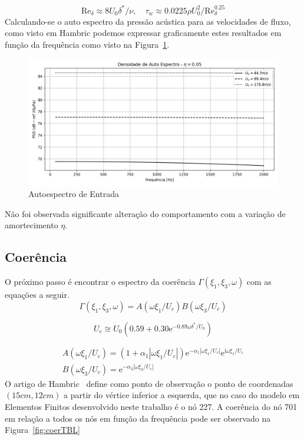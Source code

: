 \documentclass[9pt,a4paper,twoside]{rho-class/rho}
\begin{document}
\begin{equation}
	\mathrm{Re}_\delta\approx8U_0\delta^*/\nu, \quad \tau_w\approx0.0225\rho U_0^2/\mathrm{Re}_\delta^{0.25}
\end{equation}
Calculando-se o auto espectro da pressão acústica para as velocidades de fluxo, como visto em Hambric \cite{hambricVibrationsPlatesClamped2004} podemos expressar graficamente estes resultados em função da frequência como visto na Figura~\ref{fig:psd}.
\begin{figure}[H]
	\centering
	\includegraphics[width=0.9\columnwidth]{figures/psd_vel.png}
	\caption{Autoespectro de Entrada}
	\label{fig:psd}
\end{figure}
Não foi observada significante alteração do comportamento com a variação de amortecimento $\eta$.

\subsection{Coerência}

O próximo passo é encontrar o espectro da coerência $\Gamma(\xi_1,\xi_3,\omega)$ com as equações a seguir. 
\begin{equation}
	\Gamma(\xi_1,\xi_3,\omega)=A(\omega\xi_1/U_c)B(\omega\xi_3/U_c)
\end{equation}

\begin{equation}
	U_c\cong U_0(0.59+0.30\mathrm{e}^{-0.89\omega\delta^*/U_0})
\end{equation}

\begin{eqnarray}
	A(\omega\xi_1/U_c)=(1+\alpha_1|\omega\xi_1/U_c|)\mathrm{e}^{-\alpha_1|\omega\xi_1/U_c|}\mathrm{e}^{\mathrm{i}\omega\xi_1/U_c} \\
	B(\omega\xi_3/U_c)=\mathrm{e}^{-\alpha_3|\omega\xi_3/U_c|}
\end{eqnarray}
O artigo de Hambric~\cite{hambricVibrationsPlatesClamped2004} define como ponto de observação o ponto de coordenadas $(15cm, 12cm)$ a partir do vértice inferior a esquerda, que no caso do modelo em Elementos Finitos desenvolvido neste trabalho é o nó 227. A coerência do nó 701 em relação a todos os nós em função da frequência pode ser observado na Figura~\ref{fig:coerTBL}
\end{document}

